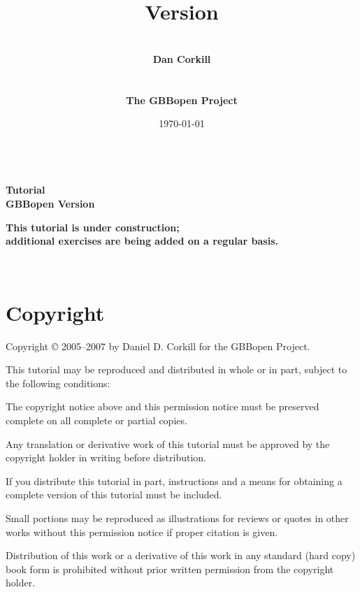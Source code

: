 \documentclass[10pt,twoside,english,pdftex]{article}
\title{\vspace{3in}{\LARGE\textbf{GBBopen Tutorial}}\\[14pt] 
{\Large\textbf{Version \gbbopenversion}}}
\author{\vspace{1in}~\\{\Large\textbf{Dan Corkill}}\\~\\~\\
  {\Large\textbf{The GBBopen Project}}\\[4pt]
  {\large\textbf{\xsitelink{http://GBBopen.org}{http://GBBopen.org}}}}
\date{\today\\[4pt] \hhmm~\timezone}
\newcommand{\inprogress}{\vfill\textcolor{darkergray}{\textsf{\textbf{This
        tutorial is under construction;\\additional exercises are being added
        on a regular basis.}}}}
\begin{document}
\T{}
\T\pagestyle{plain}
\T\thispagestyle{empty}
\T\raggedright
\T\sloppy
\T{}\baselineskip
\T\parindent=0pt
\T\maketitle
\T\renewcommand{\headrulewidth}{0pt}

\T\begin{ifhtml}
{\LARGE\bf Tutorial}\\
{\large\bf GBBopen Version \gbbopenversion}
\T\end{ifhtml}

\begin{center}
\inprogress\\
\end{center}


\T\begin{ifhtml}
  \label{sec:introduction}%
  
  \setcounter{htmlautomenu}{0}
\T\end{ifhtml}

\T\thispagestyle{empty}


\T\newpage
\T~
\T\vfill
\W{}
\W\section*{Copyright}

Copyright \copyright{} 2005--2007 by Daniel D. Corkill for the
GBBopen Project.

This tutorial may be reproduced and distributed in whole or in
part, subject to the following conditions: 

\begin{tightitemize}
\item The copyright notice above and this permission notice must be
  preserved complete on all complete or partial copies.
\item Any translation or derivative work of this tutorial must be
  approved by the copyright holder in writing before distribution.
\item If you distribute this tutorial in part, instructions and a means
  for obtaining a complete version of this tutorial must be included.
\item Small portions may be reproduced as illustrations for reviews or
quotes in other works without this permission notice if proper
citation is given.
\item Distribution of this work or a derivative of this work in any
  standard (hard copy) book form is prohibited without prior written
  permission from the copyright holder.
\end{tightitemize}
\end{document}
